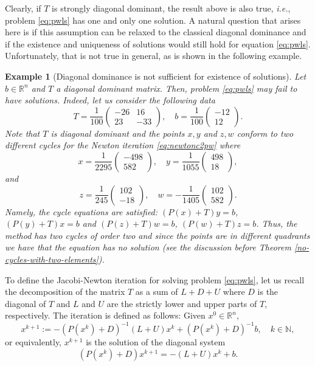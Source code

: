 \documentclass[11pt]{article}
\newtheorem{example}{Example}
\newcommand{\R}{\mathbb R}
\newcommand{\NN}{\mathbb{N}}
\begin{document}
Clearly, if $T$ is strongly diagonal dominant, the result above is also true, \emph{i.e.}, problem \eqref{eq:pwls} has one and only one solution. A natural question that arises here is if this assumption can be relaxed to the classical diagonal dominance and if the existence and uniqueness of solutions would still hold for equation \eqref{eq:pwls}. Unfortunately, that is not true in general, as is shown in the following example.


\begin{example}[Diagonal dominance is not sufficient for existence of solutions] \label{teo_finite_conv_diagdom}
Let $b \in \R^n$ and $T$ a diagonal dominant matrix. Then, problem \eqref{eq:pwls} may fail to have solutions. Indeed, let us consider the following data 
\[
T = \frac{1}{100}
\left(\begin{matrix}
-26 & 16\\
23 & -33
\end{matrix}\right),
\quad
b = \frac{1}{100}
\left(\begin{matrix}
-12\\
12
\end{matrix}\right).
\]
Note that $T$ is diagonal dominant and the points $x,y$ and $z,w$ conform to two different cycles for the Newton iteration \eqref{eq:newtonc2pw} where
\[
x =
\frac{1}{2295}\left(\begin{matrix}
-498\\
582
\end{matrix}\right)
,\quad 
y =
\frac{1}{1055}\left(\begin{matrix}
498\\
18
\end{matrix}\right),
\]
and 
\[
z =
\frac{1}{245}\left(\begin{matrix}
102\\
-18
\end{matrix}\right), \quad
w =
-\frac{1}{1405}\left(\begin{matrix}
102\\
582
\end{matrix}\right).
\]
Namely, the cycle equations are satisfied: $(P(x)+T)y=b$, $(P(y)+T)x=b$ and $(P(z)+T)w=b$, $(P(w)+T)z=b$.
Thus, the method has two cycles of order two and since the points are in different quadrants we have that the equation has no solution (see the discussion before Theorem \ref{no-cycles-with-two-elements}).

\end{example}


To define the Jacobi-Newton iteration for solving problem \eqref{eq:pwls}, let us recall the decomposition of the matrix $T$ as a sum of $L+D+U$ where $D$ is the diagonal of $T$ and $L$ and $U$ are the strictly lower and upper parts of $T$, respectively. The iteration is defined as follows: Given $x^0\in\R^n$, 
\begin{equation}\label{jaco_newton}
x^{k+1} := -(P(x^{k})+D)^{-1}(L+U) x^{k} + (P(x^{k})+D)^{-1}b, \quad k\in\NN,
\end{equation}
or equivalently, $x^{k+1}$ is the solution of the diagonal system
\begin{equation}\label{jac_newton2}
(P(x^{k})+D)x^{k+1} = -(L+U) x^{k}+b.
\end{equation}
\end{document}
